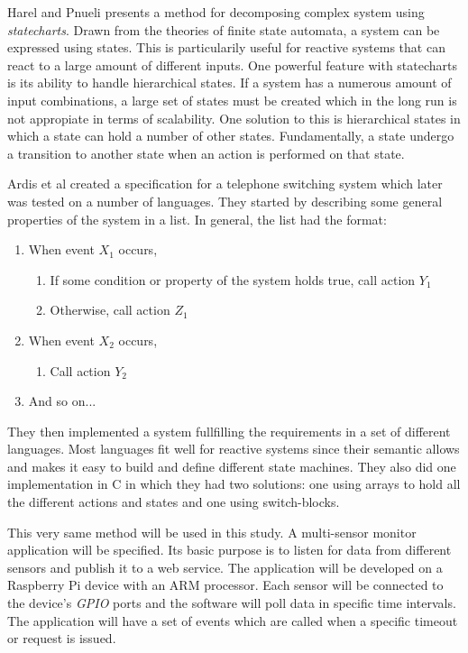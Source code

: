 Harel and Pnueli \cite{harel1985development} presents a method for decomposing
complex system using \textit{statecharts}. Drawn from the theories of finite
state automata, a system can be expressed using states. This is particularily
useful for reactive systems that can react to a large amount of different
inputs. One powerful feature with statecharts is its ability to handle
hierarchical states. If a system has a numerous amount of input combinations, a
large set of states must be created which in the long run is not appropiate in
terms of scalability. One solution to this is hierarchical states in which a
state can hold a number of other states. Fundamentally, a state undergo a
transition to another state when an action is performed on that state.
\cite{harel1985development}

Ardis et al \cite{ardis1996framework} created a specification for a telephone
switching system which later was tested on a number of languages. They started
by describing some general properties of the system in a list. In general, the
list had the format:

\begin{enumerate}
\item
  When event $X_1$ occurs,
\begin{enumerate}
\item
  If some condition or property of the system holds true, call action $Y_1$
\item
  Otherwise, call action $Z_1$
\end{enumerate}

\item
  When event $X_2$ occurs,
\begin{enumerate}
\item
  Call action $Y_2$
\end{enumerate}

\item
  And so on...
\end{enumerate}

They then implemented a system fullfilling the requirements in a set of
different languages. Most languages fit well for reactive systems since their
semantic allows and makes it easy to build and define different state machines.
They also did one implementation in C in which they had two solutions: one
using arrays to hold all the different actions and states and one using
switch-blocks.

This very same method will be used in this study. A multi-sensor monitor
application will be specified. Its basic purpose is to listen for data from
different sensors and publish it to a web service. The application will be
developed on a Raspberry Pi device with an ARM processor. Each sensor will be
connected to the device's \textit{GPIO} ports and the software will poll data
in specific time intervals. The application will have a set of events which are
called when a specific timeout or request is issued.

